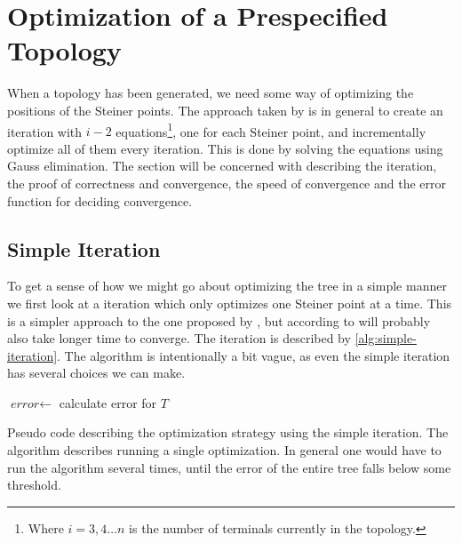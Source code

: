 \section{Optimization of a Prespecified Topology}
\label{sec:optim-presp-topol}

When a topology has been generated, we need some way of optimizing the positions of the
Steiner points. The approach taken by \citeauthor{smith1992} is in general to create an
iteration with $i-2$ equations\footnote{Where $i = 3, 4 \ldots n$ is the number of
terminals currently in the topology.}, one for each Steiner point, and incrementally
optimize all of them every iteration. This is done by solving the equations
using Gauss elimination. The section will be concerned with describing the
iteration, the proof of correctness and convergence, the speed of convergence
and the error function for deciding convergence.

\subsection{Simple Iteration}
\label{sec:simple-iteration}

To get a sense of how we might go about optimizing the tree in a simple
manner we first look at a iteration which only optimizes one Steiner point at a
time. This is a simpler approach to the one proposed by \textcite{smith1992},
but according to \citeauthor{smith1992} will probably also take longer time to
converge. The iteration is described by \cref{alg:simple-iteration}. The
algorithm is intentionally a bit vague, as even the simple iteration has several
choices we can make.

\begin{algorithm}[htbp]

  $\textit{error} \gets$ calculate error for $T$\;
  \caption[Simple iteration]{Pseudo code describing the optimization strategy
    using the simple iteration. The algorithm describes running a single
    optimization. In general one would have to run the algorithm several times,
    until the error of the entire tree falls below some threshold.\label{alg:simple-iteration}}
\end{algorithm}


